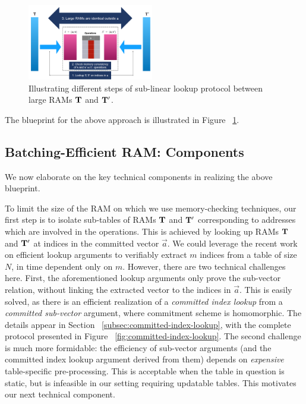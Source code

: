 \begin{figure}[htbp]
    \centering
    \includegraphics[width=0.49\textwidth]{RAM-Lookup}
    \caption{Illustrating different steps of sub-linear lookup protocol between large RAMs $\mathbf{T}$ and $\mathbf{T}'$.}
    \label{fig:blueprint}
\end{figure}

The blueprint for the above approach is illustrated in Figure ~\ref{fig:blueprint}.

\subsection{Batching-Efficient RAM: Components}\label{subsec:batching-efficient-ram-components}
We now elaborate on the key technical components in realizing the above blueprint.

\smallskip

 To limit the size of the RAM on which we use memory-checking techniques,
our first step is to isolate sub-tables of RAMs $\mathbf{T}$ and
$\mathbf{T}'$ corresponding to addresses which are involved in the operations.
This is achieved by looking up RAMs $\mathbf{T}$ and
$\mathbf{T}'$ at indices in the committed vector $\vec{a}$. We could leverage the recent work on efficient lookup
arguments to verifiably extract $m$ indices from a table of size $N$, in time dependent only on $m$.
However, there are two technical challenges here. First, the aforementioned lookup arguments only prove the sub-vector
relation, without linking the extracted vector to the indices in $\vec{a}$. This is easily solved, as there
is an efficient realization of a {\em committed index lookup} from a {\em committed sub-vector} argument,
where commitment scheme is homomorphic. The details appear in Section ~\ref{subsec:committed-index-lookup},
with the complete protocol presented in Figure ~\ref{fig:committed-index-lookup}. The second challenge is much more
formidable: the efficiency of sub-vector arguments (and the committed index lookup argument derived from them)
depends on {\em expensive} table-specific pre-processing. This is acceptable when the table in question is
static, but is infeasible in our setting requiring updatable tables. This motivates our next technical
component.

